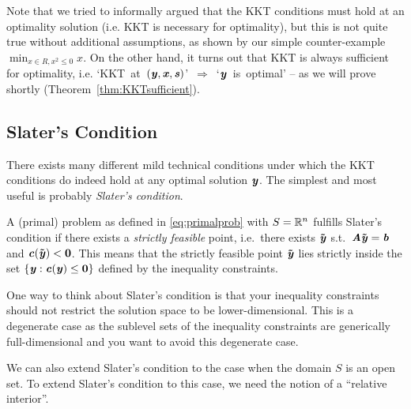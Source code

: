 {Note that we tried to informally argued that the KKT conditions must
hold at an optimality solution (i.e. KKT is necessary for optimality),
but this is not quite true without additional assumptions, as shown by
our simple counter-example $\min_{x \in R, x^2 \leq 0} x$.
On the other hand, it turns out that KKT is always sufficient for
optimality,
i.e. \mbox{`KKT at $(\boldsymbol{\mathit{y}}, \boldsymbol{\mathit{x}}, \boldsymbol{\mathit{s}})$' $\Rightarrow$ `$\boldsymbol{\mathit{y}}$ is optimal'}
-- as
we will prove shortly (Theorem~\ref{thm:KKTsufficient}).

\subsection{Slater's Condition}
There exists many different mild technical conditions under which the
KKT conditions do indeed hold at any optimal solution $\boldsymbol{\mathit{y}}$.
The simplest and most useful is probably \emph{Slater's condition}.

\begin{definition} \label{def:slater}
A (primal) problem as defined in \eqref{eq:primalprob} with $S = \mathbb{R}^n$ fulfills
Slater's condition if there exists a \emph{strictly feasible} point,
i.e.\ there exists $\boldsymbol{\tilde{\mathit{y}}}$ s.t.\ $\boldsymbol{\mathit{A}}\boldsymbol{\tilde{\mathit{y}}} = \boldsymbol{\mathit{b}}$ and $\boldsymbol{\mathit{c}}(\boldsymbol{\tilde{\mathit{y}}}) <
\boldsymbol{0}$.
This means that the strictly feasible point $\boldsymbol{\tilde{\mathit{y}}}$ lies strictly inside the set $\{\boldsymbol{\mathit{y}} : \boldsymbol{\mathit{c}}(\boldsymbol{\mathit{y}}) \leq \boldsymbol{0}\}$ defined by the inequality constraints.
\end{definition}

One way to think about Slater's condition is that your inequality
constraints should not restrict the solution space to be
lower-dimensional. This is a degenerate case as the sublevel sets of
the inequality constraints are generically full-dimensional and you
want to avoid this degenerate case.

We can also extend Slater's condition to the case when the domain $S$
is an open set.
To extend Slater's condition to this case, we need the notion of a ``relative interior''.


}
